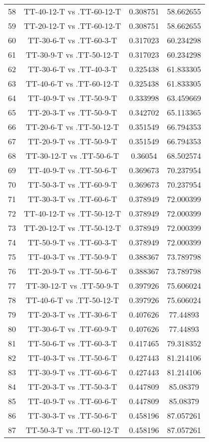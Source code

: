 \documentclass[a4paper,10pt]{article}
\begin{document}
\begin{landscape}
\begin{table}[!htp]
\begin{tabular}{cccc}
58&TT-40-12-T vs .TT-60-12-T&0.308751&58.662655\\
59&TT-20-12-T vs .TT-60-12-T&0.308751&58.662655\\
60&TT-30-6-T vs .TT-60-3-T&0.317023&60.234298\\
61&TT-30-9-T vs .TT-50-12-T&0.317023&60.234298\\
62&TT-30-6-T vs .TT-40-3-T&0.325438&61.833305\\
63&TT-40-6-T vs .TT-60-12-T&0.325438&61.833305\\
64&TT-40-9-T vs .TT-50-9-T&0.333998&63.459669\\
65&TT-20-3-T vs .TT-50-9-T&0.342702&65.113365\\
66&TT-20-6-T vs .TT-50-12-T&0.351549&66.794353\\
67&TT-20-9-T vs .TT-50-9-T&0.351549&66.794353\\
68&TT-30-12-T vs .TT-50-6-T&0.36054&68.502574\\
69&TT-40-9-T vs .TT-50-6-T&0.369673&70.237954\\
70&TT-50-3-T vs .TT-60-9-T&0.369673&70.237954\\
71&TT-30-3-T vs .TT-60-6-T&0.378949&72.000399\\
72&TT-40-12-T vs .TT-50-12-T&0.378949&72.000399\\
73&TT-20-12-T vs .TT-50-12-T&0.378949&72.000399\\
74&TT-50-9-T vs .TT-60-3-T&0.378949&72.000399\\
75&TT-40-3-T vs .TT-50-9-T&0.388367&73.789798\\
76&TT-20-9-T vs .TT-50-6-T&0.388367&73.789798\\
77&TT-30-12-T vs .TT-50-9-T&0.397926&75.606024\\
78&TT-40-6-T vs .TT-50-12-T&0.397926&75.606024\\
79&TT-20-3-T vs .TT-30-6-T&0.407626&77.44893\\
80&TT-30-6-T vs .TT-60-9-T&0.407626&77.44893\\
81&TT-50-6-T vs .TT-60-3-T&0.417465&79.318352\\
82&TT-40-3-T vs .TT-50-6-T&0.427443&81.214106\\
83&TT-30-9-T vs .TT-60-6-T&0.427443&81.214106\\
84&TT-20-3-T vs .TT-50-3-T&0.447809&85.08379\\
85&TT-40-9-T vs .TT-60-6-T&0.447809&85.08379\\
86&TT-30-3-T vs .TT-50-6-T&0.458196&87.057261\\
87&TT-50-3-T vs .TT-60-12-T&0.458196&87.057261\\

\end{tabular}
\end{table}
\end{landscape}
\end{document}
